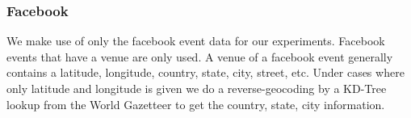 \subsubsection{Facebook}
We make use of only the facebook event data for our experiments. Facebook events that have a venue are only used. A venue of a facebook event generally contains a latitude, longitude, country, state, city, street, etc. Under cases where only latitude and longitude is given we do a reverse-geocoding by a KD-Tree lookup\cite{kd-tree} from the World Gazetteer to get the country, state, city information. 
